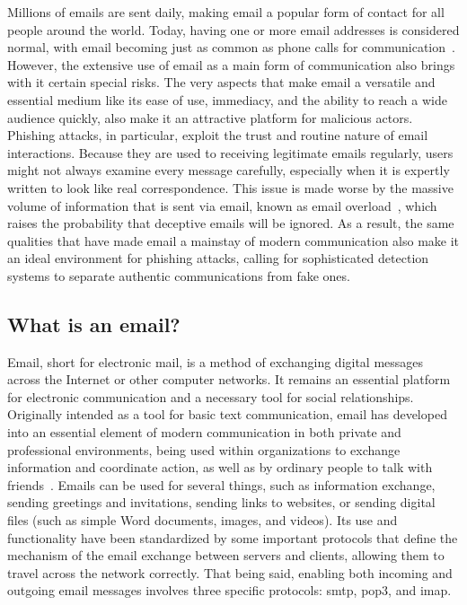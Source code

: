 
Millions of emails are sent daily, making email a popular form of contact for all people around the world. Today, having one or more email addresses is considered normal, with email becoming just as common as phone calls for communication~\cite{durscheid2013email}.
However, the extensive use of email as a main form of communication also brings with it certain special risks. The very aspects that make email a versatile and essential medium like its ease of use, immediacy, and the ability to reach a wide audience quickly, also make it an attractive platform for malicious actors. Phishing attacks, in particular, exploit the trust and routine nature of email interactions. Because they are used to receiving legitimate emails regularly, users might not always examine every message carefully, especially when it is expertly written to look like real correspondence. This issue is made worse by the massive volume of information that is sent via email, known as email overload~\cite{vacek2014survive}, which raises the probability that deceptive emails will be ignored.
As a result, the same qualities that have made email a mainstay of modern communication also make it an ideal environment for phishing attacks, calling for sophisticated detection systems to separate authentic communications from fake ones.

\subsection{What is an email?}

Email, short for electronic mail, is a method of exchanging digital messages across the Internet or other computer networks. It remains an essential platform for electronic communication and a necessary tool for social relationships. Originally intended as a tool for basic text communication, email has developed into an essential element of modern communication in both private and professional environments, being used within organizations to exchange information and coordinate action, as well as by ordinary people to talk with friends~\cite{kooti2015evolution}.
Emails can be used for several things, such as information exchange, sending greetings and invitations, sending links to websites, or sending digital files (such as simple Word documents, images, and videos). Its use and functionality have been standardized by some important protocols that define the mechanism of the email exchange between servers and clients, allowing them to travel across the network correctly. That being said, enabling both incoming and outgoing email messages involves three specific protocols: \ac{smtp}, \ac{pop3}, and \ac{imap}. 

